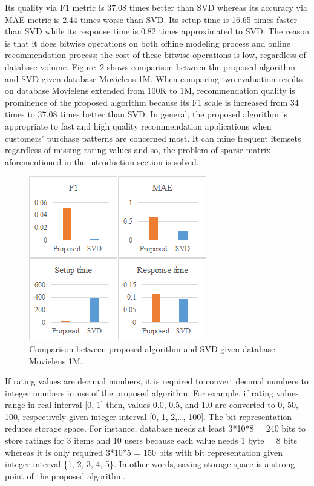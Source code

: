 \documentclass{sig-alternate}
\begin{document}
Its quality via F1 metric is 37.08 times better than SVD whereas its accuracy via MAE metric is 2.44 times worse than SVD. Its setup time is 16.65 times faster than SVD while its response time is 0.82 times approximated to SVD. The reason is that it does bitwise operations on both offline modeling process and online recommendation process; the cost of these bitwise operations is low, regardless of database volume. Figure~2 shows comparison between the proposed algorithm and SVD given database Movielens 1M. When comparing two evaluation results on database Movielens extended from 100K to 1M, recommendation quality is prominence of the proposed algorithm because its F1 scale is increased from 34 times to 37.08 times better than SVD. In general, the proposed algorithm is appropriate to fast and high quality recommendation applications when customers' purchase patterns are concerned most. It can mine frequent itemsets regardless of missing rating values and so, the problem of sparse matrix aforementioned in the introduction section is solved.
\begin{figure} \label{figure:comparison1m}
\centering
\includegraphics{Comparison1M.png}
\caption{Comparison between proposed algorithm and SVD given database Movielens 1M.}
\label{figure:time100K}
\end{figure}

If rating values are decimal numbers, it is required to convert decimal numbers to integer numbers in use of the proposed algorithm. For example, if rating values range in real interval [0, 1] then, values 0.0, 0.5, and 1.0 are converted to 0, 50, 100, respectively given integer interval [0, 1, 2,\ldots, 100]. The bit representation reduces storage space. For instance, database needs at least 3*10*8 = 240 bits to store ratings for 3 items and 10 users because each value needs 1 byte = 8 bits whereas it is only required 3*10*5 = 150 bits with bit representation given integer interval \{1, 2, 3, 4, 5\}. In other words, saving storage space is a strong point of the proposed algorithm.
\end{document}
